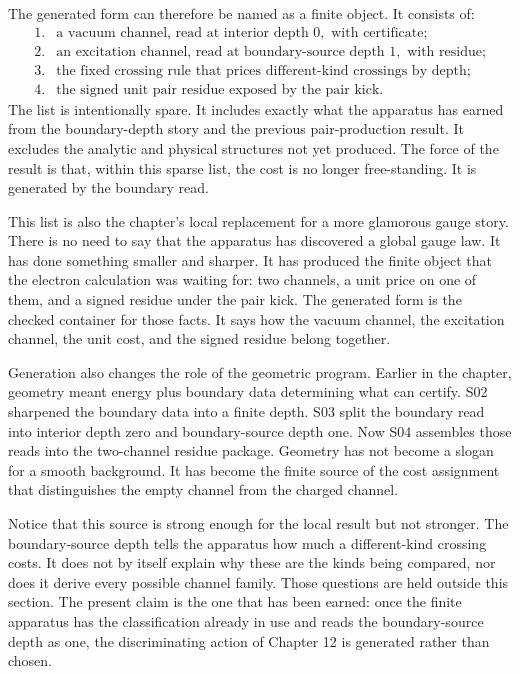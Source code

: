 The generated form can therefore be named as a finite object. It consists of:
\[
\begin{array}{ll}
1. & \text{a vacuum channel, read at interior depth }0,\text{ with certificate;}\\
2. & \text{an excitation channel, read at boundary-source depth }1,\text{ with residue;}\\
3. & \text{the fixed crossing rule that prices different-kind crossings by depth;}\\
4. & \text{the signed unit pair residue exposed by the pair kick.}
\end{array}
\]
The list is intentionally spare. It includes exactly what the apparatus has earned
from the boundary-depth story and the previous pair-production result. It excludes
the analytic and physical structures not yet produced. The force of the result is
that, within this sparse list, the cost is no longer free-standing. It is generated
by the boundary read.

This list is also the chapter's local replacement for a more glamorous gauge story.
There is no need to say that the apparatus has discovered a global gauge law. It has
done something smaller and sharper. It has produced the finite object that the
electron calculation was waiting for: two channels, a unit price on one of them, and
a signed residue under the pair kick. The generated form is the checked container
for those facts. It says how the vacuum channel, the excitation channel, the unit
cost, and the signed residue belong together.

Generation also changes the role of the geometric program. Earlier in the chapter,
geometry meant energy plus boundary data determining what can certify. S02 sharpened
the boundary data into a finite depth. S03 split the boundary read into interior
depth zero and boundary-source depth one. Now S04 assembles those reads into the
two-channel residue package. Geometry has not become a slogan for a smooth
background. It has become the finite source of the cost assignment that distinguishes
the empty channel from the charged channel.

Notice that this source is strong enough for the local result but not stronger. The
boundary-source depth tells the apparatus how much a different-kind crossing costs.
It does not by itself explain why these are the kinds being compared, nor does it
derive every possible channel family. Those questions are held outside this section.
The present claim is the one that has been earned: once the finite apparatus has the
classification already in use and reads the boundary-source depth as one, the
discriminating action of Chapter 12 is generated rather than chosen.

